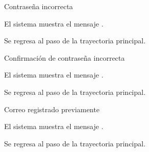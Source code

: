 {\begin{trayectoriaAlternativa}
  \end{trayectoriaAlternativa}


  \begin{trayectoriaAlternativa}
    {Contraseña incorrecta}

    \item El sistema muestra el mensaje
      .

    \item Se regresa al paso  de la trayectoria
      principal.

  \end{trayectoriaAlternativa}


  \begin{trayectoriaAlternativa}
    {Confirmación de contraseña incorrecta}

    \item El sistema muestra el mensaje
      .

    \item Se regresa al paso  de la trayectoria
      principal.

  \end{trayectoriaAlternativa}


  \begin{trayectoriaAlternativa}
    {Correo registrado previamente}

    \item El sistema muestra el mensaje
      .

    \item Se regresa al paso  de la trayectoria
      principal.

  \end{trayectoriaAlternativa}

}

